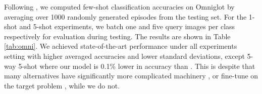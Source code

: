 \documentclass[10pt,twocolumn,letterpaper]{article}
\begin{document}
Following \cite{snell2017prototypical}, we computed few-shot classification accuracies on Omniglot by averaging over 1000 randomly generated episodes from the testing set. 
For the 1-shot and 5-shot experiments, we batch one and five query images per class respectively for evaluation during testing.
The results are shown in Table \ref{tab:omni}. We achieved state-of-the-art performance under all experiments setting with higher averaged accuracies and lower standard deviations, except 5-way 5-shot where our model is 0.1\% lower in accuracy than \cite{finn2017model}. This is despite that many alternatives have significantly more complicated machinery \cite{munkhdalai2017meta,edwards2016towards}, or fine-tune on the target problem \cite{finn2017model,vinyals2016matching},  while we do not.


\setlength{\tabcolsep}{10pt}
\end{document}
